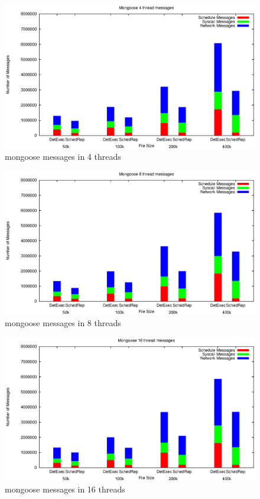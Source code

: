 \begin{figure}
\centering
\includegraphics[width=1\columnwidth]{figures/mg_msg_4}
\caption{mongoose messages in 4 threads}
\label{f:mg_msg_4}
\end{figure}
\begin{figure}
\centering
\includegraphics[width=1\columnwidth]{figures/mg_msg_8}
\caption{mongoose messages in 8 threads}
\label{f:mg_msg_8}
\end{figure}
\begin{figure}
\centering
\includegraphics[width=1\columnwidth]{figures/mg_msg_16}
\caption{mongoose messages in 16 threads}
\label{f:mg_msg_16}
\end{figure}
